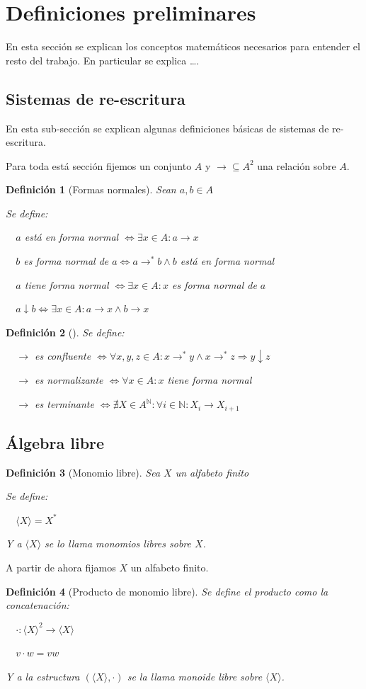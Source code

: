\documentclass{amsbook}
\theoremstyle{customstyle}
\newtheorem{definition}{Definición}[section]
\newcommand{\definición}[2][]{
  \begin{definition}[#1]
  \setlength{\parindent}{2em} %
  #2
  \end{definition}
}
\begin{document}
\fontsize{16pt}{19pt}\selectfont %


\section{Definiciones preliminares}

En esta sección se explican los conceptos matemáticos necesarios para entender el resto del trabajo.
En particular se explica …. %

\subsection{Sistemas de re-escritura}

En esta sub-sección se explican algunas definiciones básicas de sistemas de re-escritura.

Para toda está sección fijemos un conjunto $A$ y $→ ⊆ A^2$ una relación sobre $A$.

\definición[Formas normales] {
Sean $a, b ∈ A$

Se define:

  $a$ está en forma normal $⇔ ∃x ∈ A : a → x$

  $b$ es forma normal de $a ⇔ a →^* b ∧ b$ está en forma normal

  $a$ tiene forma normal $⇔ ∃x ∈ A : x$ es forma normal de $a$

  $a ↓ b ⇔ ∃x ∈ A : a → x ∧ b → x$
}

\definición[] {


Se define:

  $→$ es confluente $⇔ ∀x, y, z ∈ A : x →^* y ∧ x →^*z ⇒ y ↓ z$

  $→$ es normalizante $⇔ ∀x ∈ A : x$ tiene forma normal

  $→$ es terminante $⇔ ∄X ∈ A^ℕ : ∀i ∈ ℕ : X_i → X_{i + 1}$
}


\subsection{Álgebra libre}

\definición[Monomio libre] {
Sea $X$ un alfabeto finito

Se define:

  $⟨X⟩ = X^*$

Y a $⟨X⟩$ se lo llama monomios libres sobre $X$.
}

A partir de ahora fijamos $X$ un alfabeto finito.

\definición[Producto de monomio libre] {
Se define el producto como la concatenación:

  $· : ⟨X⟩^2 → ⟨X⟩$

  $v · w = vw$

Y a la estructura $(⟨X⟩, ·)$ se la llama monoide libre sobre $⟨X⟩$.
}
\end{document}
